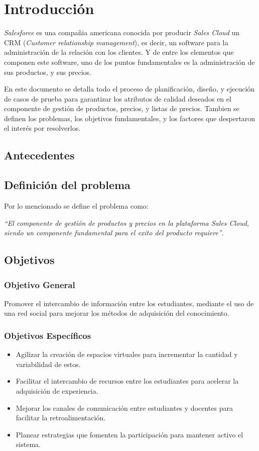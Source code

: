 \chapter{Introducción}

\emph{Salesforce} es una compañia americana conocida por producir
\emph{Sales Cloud} un CRM (\emph{Customer relationship management}), es decir,
un software para la administración de la relación con los clientes. Y de entre
los elementos que componen este software, uno de los puntos fundamentales es la
administración de sus productos, y sus precios.

En este documento se detalla todo el proceso de planificación, diseño, y
ejecución de casos de prueba para garantizar los atributos de calidad deseados
en el componente de gestión de productos, precios, y listas de precios. Tambien
se definen los problemas, los objetivos fundamentales, y los
factores que despertaron el interés por resolverlos.

\section{Antecedentes}

\section{Definición del problema}

Por lo mencionado se define el problema como:

\emph{“El componente de gestión de productos y precios en la plataforma Sales
Cloud, siendo un componente fundamental para el exito del producto requiere”}.

\section{Objetivos}

\subsection{Objetivo General}
Promover el intercambio de información entre los estudiantes, mediante el uso
de una red social para mejorar los métodos de adquisición del conocimiento.

\subsection{Objetivos Específicos}
\begin{itemize}
\item Agilizar la creación de espacios virtuales para incrementar la cantidad y
variabilidad de estos.
\item Facilitar el intercambio de recursos entre los estudiantes para acelerar
la adquisición de experiencia.
\item Mejorar los canales de comunicación entre estudiantes y docentes para
facilitar la retroalimentación.
\item Planear estrategias que fomenten la participación para mantener activo el
sistema.
\end{itemize}

